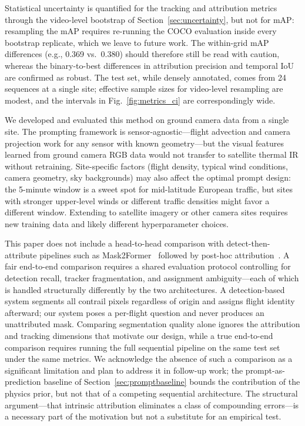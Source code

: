 \documentclass[review]{elsarticle}
\begin{document}
Statistical uncertainty is quantified for the tracking and attribution metrics through the video-level bootstrap of Section~\ref{sec:uncertainty}, but not for mAP: resampling the mAP requires re-running the COCO evaluation inside every bootstrap replicate, which we leave to future work. The within-grid mAP differences (e.g., 0.369 vs.\ 0.380) should therefore still be read with caution, whereas the binary-to-best differences in attribution precision and temporal IoU are confirmed as robust. The test set, while densely annotated, comes from 24 sequences at a single site; effective sample sizes for video-level resampling are modest, and the intervals in Fig.~\ref{fig:metrics_ci} are correspondingly wide.

We developed and evaluated this method on ground camera data from a single site. The prompting framework is sensor-agnostic---flight advection and camera projection work for any sensor with known geometry---but the visual features learned from ground camera RGB data would not transfer to satellite thermal IR without retraining. Site-specific factors (flight density, typical wind conditions, camera geometry, sky backgrounds) may also affect the optimal prompt design: the 5-minute window is a sweet spot for mid-latitude European traffic, but sites with stronger upper-level winds or different traffic densities might favor a different window. Extending to satellite imagery or other camera sites requires new training data and likely different hyperparameter choices.

This paper does not include a head-to-head comparison with detect-then-attribute pipelines such as Mask2Former~\cite{cheng2021maskformer, cheng2021mask2former_video} followed by post-hoc attribution~\cite{dalmau2025attribution}. A fair end-to-end comparison requires a shared evaluation protocol controlling for detection recall, tracker fragmentation, and assignment ambiguity---each of which is handled structurally differently by the two architectures. A detection-based system segments all contrail pixels regardless of origin and assigns flight identity afterward; our system poses a per-flight question and never produces an unattributed mask. Comparing segmentation quality alone ignores the attribution and tracking dimensions that motivate our design, while a true end-to-end comparison requires running the full sequential pipeline on the same test set under the same metrics. We acknowledge the absence of such a comparison as a significant limitation and plan to address it in follow-up work; the prompt-as-prediction baseline of Section~\ref{sec:promptbaseline} bounds the contribution of the physics prior, but not that of a competing sequential architecture. The structural argument---that intrinsic attribution eliminates a class of compounding errors---is a necessary part of the motivation but not a substitute for an empirical test.
\end{document}
